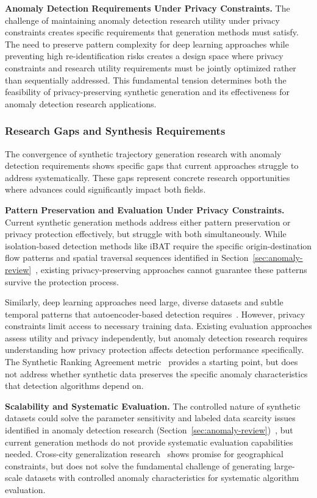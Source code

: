 \documentclass[runningheads]{llncs}
\begin{document}
\textbf{Anomaly Detection Requirements Under Privacy Constraints.} The challenge of maintaining anomaly detection research utility under privacy constraints creates specific requirements that generation methods must satisfy. The need to preserve pattern complexity for deep learning approaches while preventing high re-identification risks creates a design space where privacy constraints and research utility requirements must be jointly optimized rather than sequentially addressed. This fundamental tension determines both the feasibility of privacy-preserving synthetic generation and its effectiveness for anomaly detection research applications.

\subsubsection{Research Gaps and Synthesis Requirements}

The convergence of synthetic trajectory generation research with anomaly detection requirements shows specific gaps that current approaches struggle to address systematically. These gaps represent concrete research opportunities where advances could significantly impact both fields.

\textbf{Pattern Preservation and Evaluation Under Privacy Constraints.} Current synthetic generation methods address either pattern preservation or privacy protection effectively, but struggle with both simultaneously. While isolation-based detection methods like iBAT require the specific origin-destination flow patterns and spatial traversal sequences identified in Section~\ref{sec:anomaly-review}~\cite{zhang2019ibat}, existing privacy-preserving approaches cannot guarantee these patterns survive the protection process.

Similarly, deep learning approaches need large, diverse datasets and subtle temporal patterns that autoencoder-based detection requires~\cite{huang2021lstm}. However, privacy constraints limit access to necessary training data. Existing evaluation approaches assess utility and privacy independently, but anomaly detection research requires understanding how privacy protection affects detection performance specifically. The Synthetic Ranking Agreement metric~\cite{jordon2019pate} provides a starting point, but does not address whether synthetic data preserves the specific anomaly characteristics that detection algorithms depend on.

\textbf{Scalability and Systematic Evaluation.} The controlled nature of synthetic datasets could solve the parameter sensitivity and labeled data scarcity issues identified in anomaly detection research (Section~\ref{sec:anomaly-review})~\cite{zhang2019ibat}, but current generation methods do not provide systematic evaluation capabilities needed. Cross-city generalization research~\cite{wang2025gtg} shows promise for geographical constraints, but does not solve the fundamental challenge of generating large-scale datasets with controlled anomaly characteristics for systematic algorithm evaluation.
\end{document}
